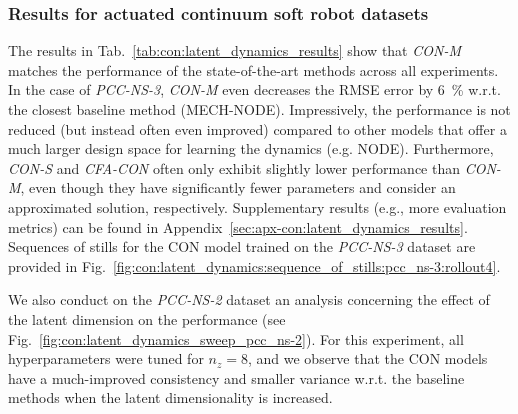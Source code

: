 \subsubsection{Results for actuated continuum soft robot datasets} 
The results in Tab.~\ref{tab:con:latent_dynamics_results} show that \emph{CON-M} matches the performance of the state-of-the-art methods across all experiments. In the case of \emph{PCC-NS-3}, \emph{CON-M} even decreases the \gls{RMSE} error by \SI{6}{\percent} w.r.t. the closest baseline method (MECH-NODE).
Impressively, the performance is not reduced (but instead often even improved) compared to other models that offer a much larger design space for learning the dynamics (e.g. \gls{NODE}).
Furthermore, \emph{CON-S} and \emph{CFA-CON} often only exhibit slightly lower performance than \emph{CON-M}, even though they have significantly fewer parameters and consider an approximated solution, respectively.
Supplementary results (e.g., more evaluation metrics) can be found in Appendix~\ref{sec:apx-con:latent_dynamics_results}. Sequences of stills for the \gls{CON} model trained on the \emph{PCC-NS-3} dataset are provided in Fig.~\ref{fig:con:latent_dynamics:sequence_of_stills:pcc_ns-3:rollout4}.

We also conduct on the \emph{PCC-NS-2} dataset an analysis concerning the effect of the latent dimension on the performance (see Fig.~\ref{fig:con:latent_dynamics_sweep_pcc_ns-2}). For this experiment, all hyperparameters were tuned for $n_z=8$, and we observe that the \gls{CON} models have a much-improved consistency and smaller variance w.r.t. the baseline methods when the latent dimensionality is increased.

